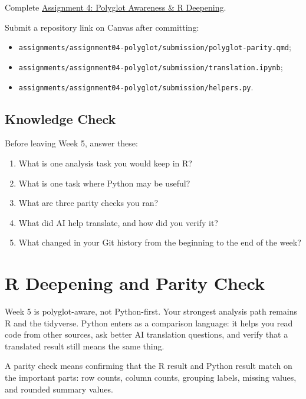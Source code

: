 \documentclass[
  letterpaper,
  DIV=11,
  numbers=noendperiod,
  oneside]{scrreprt}
\providecommand{\tightlist}{%
  \setlength{\itemsep}{0pt}\setlength{\parskip}{0pt}}
\begin{document}

Complete
\href{../../assignments/assignment04-polyglot/README.md}{Assignment 4:
Polyglot Awareness \& R Deepening}.

Submit a repository link on Canvas after committing:

\begin{itemize}
\tightlist
\item
  \texttt{assignments/assignment04-polyglot/submission/polyglot-parity.qmd};
\item
  \texttt{assignments/assignment04-polyglot/submission/translation.ipynb};
\item
  \texttt{assignments/assignment04-polyglot/submission/helpers.py}.
\end{itemize}

\section*{Knowledge Check}\label{knowledge-check-2}


Before leaving Week 5, answer these:

\begin{enumerate}
\def\labelenumi{\arabic{enumi}.}
\tightlist
\item
  What is one analysis task you would keep in R?
\item
  What is one task where Python may be useful?
\item
  What are three parity checks you ran?
\item
  What did AI help translate, and how did you verify it?
\item
  What changed in your Git history from the beginning to the end of the
  week?
\end{enumerate}

\chapter{R Deepening and Parity
Check}\label{r-deepening-and-parity-check}

Week 5 is polyglot-aware, not Python-first. Your strongest analysis path
remains R and the tidyverse. Python enters as a comparison language: it
helps you read code from other sources, ask better AI translation
questions, and verify that a translated result still means the same
thing.

A parity check means confirming that the R result and Python result
match on the important parts: row counts, column counts, grouping
labels, missing values, and rounded summary values.
\end{document}
